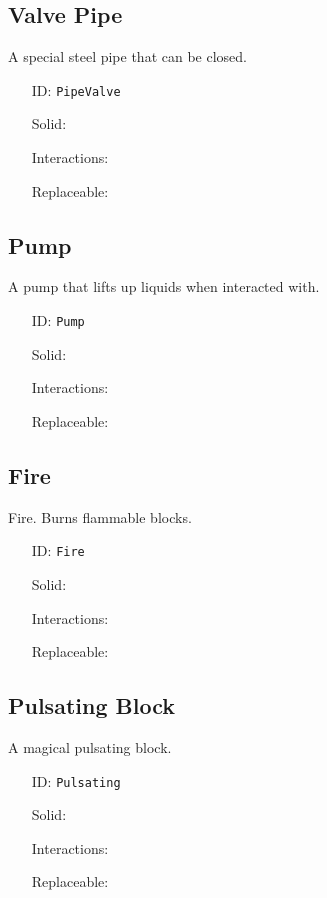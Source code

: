 \subsection{Valve Pipe}\label{subsec:blocks_valve pipe}
A special steel pipe that can be closed.
\newline
\begin{itemize}[nosep]
    \item[ID:] \texttt{PipeValve}
    \item[Solid:]  \Checkmark \item[Interactions:]  \Checkmark \item[Replaceable:]  \XSolidBrush
\end{itemize}

\subsection{Pump}\label{subsec:blocks_pump}
A pump that lifts up liquids when interacted with.
\newline
\begin{itemize}[nosep]
    \item[ID:] \texttt{Pump}
    \item[Solid:]  \Checkmark \item[Interactions:]  \Checkmark \item[Replaceable:]  \XSolidBrush
\end{itemize}

\subsection{Fire}\label{subsec:blocks_fire}
Fire. Burns flammable blocks.
\newline
\begin{itemize}[nosep]
    \item[ID:] \texttt{Fire}
    \item[Solid:]  \XSolidBrush \item[Interactions:]  \XSolidBrush \item[Replaceable:]  \Checkmark
\end{itemize}

\subsection{Pulsating Block}\label{subsec:blocks_pulsating block}
A magical pulsating block.
\newline
\begin{itemize}[nosep]
    \item[ID:] \texttt{Pulsating}
    \item[Solid:]  \Checkmark \item[Interactions:]  \Checkmark \item[Replaceable:]  \XSolidBrush
\end{itemize}

